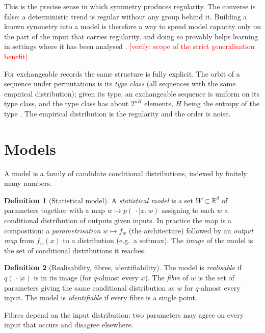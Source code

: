 \documentclass[11pt]{article}
\theoremstyle{definition}
\newtheorem{definition}{Definition}[section]
\theoremstyle{plain}
\theoremstyle{remark}
\newcommand{\verify}[1]{\textcolor{red}{[verify: #1]}}
\newcommand{\W}{W}
\newcommand{\R}{\mathbb{R}}
\begin{document}
This is the precise sense in which symmetry produces regularity. The
converse is false: a deterministic trend is regular without any group
behind it. Building a known symmetry into a model is therefore a way to
spend model capacity only on the part of the input that carries
regularity, and doing so provably helps learning in settings where it
has been analysed \cite{elesedy2021}. \verify{scope of the strict
generalisation benefit}

For exchangeable records the same structure is fully explicit. The
orbit of a sequence under permutations is its \emph{type class} (all
sequences with the same empirical distribution); given its type, an
exchangeable sequence is uniform on its type class, and the type class
has about $2^{nH}$ elements, $H$ being the entropy of the type
\cite{csiszar1998}. The empirical distribution is the regularity and
the order is noise.

\section{Models}\label{sec:models}

A model is a family of candidate conditional distributions, indexed by
finitely many numbers.

\begin{definition}[Statistical model]
A \emph{statistical model} is a set $\W\subset\R^d$ of parameters
together with a map $w \mapsto p(\,\cdot\mid x, w)$ assigning to each
$w$ a conditional distribution of outputs given inputs. In practice the
map is a composition: a \emph{parametrisation} $w\mapsto f_w$ (the
architecture) followed by an \emph{output map} from $f_w(x)$ to a
distribution (e.g.\ a softmax). The \emph{image} of the model is the set
of conditional distributions it reaches.
\end{definition}

\begin{definition}[Realisability, fibres, identifiability]
The model is \emph{realisable} if $q(\,\cdot\mid x)$ is in its image
(for $q$-almost every $x$). The \emph{fibre} of $w$ is the set of
parameters giving the same conditional distribution as $w$ for
$q$-almost every input. The model is \emph{identifiable} if every fibre
is a single point.
\end{definition}

Fibres depend on the input distribution: two parameters may agree on
every input that occurs and disagree elsewhere.
\end{document}
